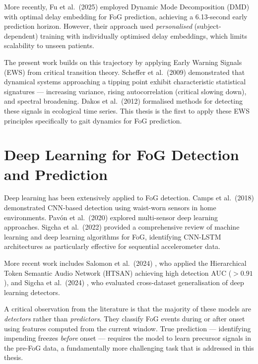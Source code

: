 \documentclass[12pt,a4paper,oneside]{report}
\numberwithin{equation}{chapter}
\numberwithin{figure}{chapter}
\numberwithin{table}{chapter}
\begin{document}
More recently, Fu et al.\ (2025) \cite{fu2025} employed Dynamic Mode Decomposition (DMD) with optimal delay embedding for FoG prediction, achieving a 6.13-second early prediction horizon. However, their approach used \textit{personalised} (subject-dependent) training with individually optimised delay embeddings, which limits scalability to unseen patients.

The present work builds on this trajectory by applying Early Warning Signals (EWS) from critical transition theory. Scheffer et al.\ (2009) \cite{scheffer2009} demonstrated that dynamical systems approaching a tipping point exhibit characteristic statistical signatures --- increasing variance, rising autocorrelation (critical slowing down), and spectral broadening. Dakos et al.\ (2012) \cite{dakos2012} formalised methods for detecting these signals in ecological time series. This thesis is the first to apply these EWS principles specifically to gait dynamics for FoG prediction.

\section{Deep Learning for FoG Detection and Prediction}

Deep learning has been extensively applied to FoG detection. Camps et al.\ (2018) \cite{camps2018} demonstrated CNN-based detection using waist-worn sensors in home environments. Pav\'{o}n et al.\ (2020) \cite{pavon2020} explored multi-sensor deep learning approaches. Sigcha et al.\ (2022) \cite{sigcha2022} provided a comprehensive review of machine learning and deep learning algorithms for FoG, identifying CNN-LSTM architectures as particularly effective for sequential accelerometer data.

More recent work includes Salomon et al.\ (2024) \cite{salomon2024}, who applied the Hierarchical Token Semantic Audio Network (HTSAN) achieving high detection AUC ($>0.91$), and Sigcha et al.\ (2024) \cite{sigcha2024}, who evaluated cross-dataset generalisation of deep learning detectors.

A critical observation from the literature is that the majority of these models are \textit{detectors} rather than \textit{predictors}. They classify FoG events during or after onset using features computed from the current window. True prediction --- identifying impending freezes \textit{before} onset --- requires the model to learn precursor signals in the pre-FoG data, a fundamentally more challenging task that is addressed in this thesis.
\end{document}
